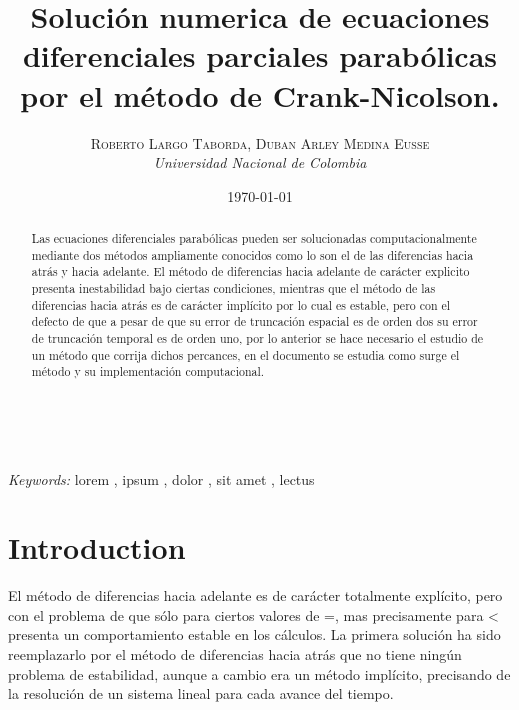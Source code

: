 \documentclass[11pt]{article} %
\title{\textbf{Solución numerica de ecuaciones diferenciales parciales parabólicas por el método de Crank-Nicolson.}\\ %
}
\author{\textsc{Roberto Largo Taborda, Duban Arley Medina Eusse} %
\\{\textit{Universidad Nacional de Colombia}}} %
\date{\today} %
\makeatletter
\renewcommand{\maketitle}{ %
\begin{flushright} %
{\LARGE\@title} %

\vspace{50pt} %

{\large\@author} %
\\\@date %

\vspace{40pt} %
\end{flushright}
}
\makeatother
\begin{document}
\maketitle %


\renewcommand{\abstractname}{Resumen} %

\begin{abstract}
Las ecuaciones diferenciales parabólicas pueden ser solucionadas computacionalmente mediante dos métodos ampliamente conocidos como lo son el de las diferencias hacia atrás y hacia adelante. El método de diferencias hacia adelante de carácter explicito presenta inestabilidad bajo ciertas condiciones, mientras que el método de las diferencias hacia atrás es de carácter implícito por lo cual es estable, pero con el defecto de que a pesar de que su error de truncación espacial es de orden dos su error de truncación temporal es de orden uno, por lo anterior se hace necesario el estudio de un método que corrija dichos percances, en el documento se estudia como surge el método y su implementación computacional.
\end{abstract}

\hspace*{3,6mm}\textit{Keywords:} lorem , ipsum , dolor , sit amet , lectus %

\vspace{30pt} %


\section*{Introduction}

El método de diferencias hacia adelante es de carácter totalmente explícito, pero con el problema de que sólo para ciertos valores de \lambda =, mas precisamente para \lambda <  presenta un comportamiento estable en los cálculos. La primera solución ha sido reemplazarlo por el método de diferencias hacia atrás que no tiene ningún problema de estabilidad, aunque a cambio era un método implícito, precisando de la resolución de un sistema lineal para cada avance del tiempo.
\end{document}
